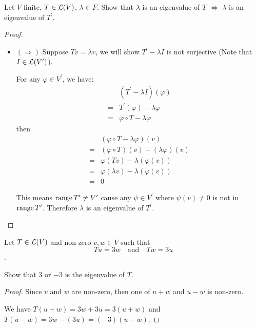 \documentclass[../main.tex]{subfiles}
\begin{document}
\setcounter{exercise}{14}
\begin{exercise}
  Let $V$ finite, $T \in \mathcal{L}(V)$, $\lambda \in F$.
  Show that $\lambda$ is an eigenvalue of $T$ $\iff$ $\lambda$ is an eigenvalue of $T^\prime$.
\end{exercise}
\begin{proof}
  ~
  \begin{itemize}
    \item $(\Rightarrow)$ Suppose $Tv = \lambda v$, we will show $T^\prime - \lambda I$
          is not surjective (Note that $I \in \mathcal{L}(V^\prime)$).

          For any $\varphi \in V^\prime$, we have:
          \begin{align*}
             & (T^\prime - \lambda I)(\varphi) \\
            =& T^\prime(\varphi) - \lambda \varphi \\
            =& \varphi \circ T - \lambda \varphi
          \end{align*}
          then
          \begin{align*}
             & (\varphi \circ T - \lambda \varphi)(v) \\
            =& (\varphi \circ T)(v) - (\lambda \varphi)(v) \\
            =& \varphi (Tv) - \lambda (\varphi (v)) \\
            =& \varphi (\lambda v) - \lambda (\varphi (v)) \\
            =& 0
          \end{align*}

          This means $\operatorname{range} T^\prime \neq V^\prime$ cause any $\psi \in V^\prime$
          where $\psi(v) \neq 0$ is not in $\operatorname{range} T^\prime$. Therefore $\lambda$
          is an eigenvalue of $T^\prime$.
  \end{itemize}
\end{proof}

\setcounter{exercise}{21}
\begin{exercise}
  Let $T \in \mathcal{L}(V)$ and non-zero $v, w \in V$ such that
  \[
  Tu = 3w \quad \text{and} \quad Tw = 3u
  \].

  Show that $3$ or $-3$ is the eigenvalue of $T$.
\end{exercise}
\begin{proof}
  Since $v$ and $w$ are non-zero, then one of $u + w$ and $u - w$
  is non-zero.

  We have $T(u + w) = 3w + 3u = 3(u + w)$ and $T(u - w) = 3w - (3u) = (-3)(u - w)$.
\end{proof}
\end{document}
